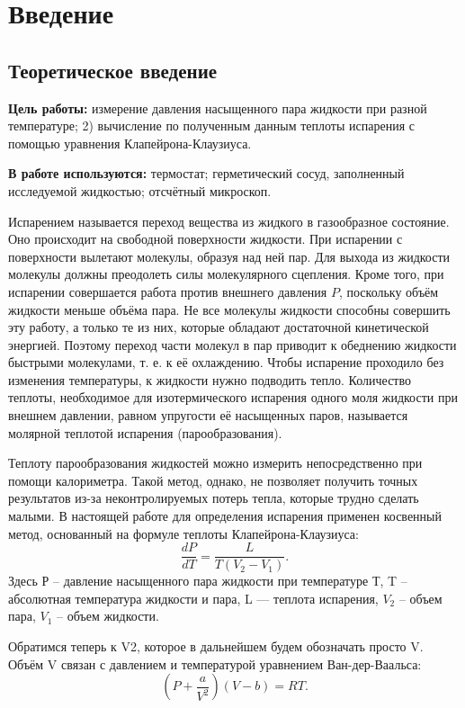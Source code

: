 \section{Введение}
\subsection{Теоретическое введение}
\textbf{Цель работы:}
измерение давления насыщенного пара жидкости
при разной температуре; 2) вычисление по полученным данным теплоты испарения с помощью уравнения Клапейрона-Клаузиуса.

\textbf{В работе используются:}
термостат; герметический
сосуд,
заполненный исследуемой жидкостью; отсчётный микроскоп.


Испарением называется переход вещества из жидкого в газообразное состояние. Оно происходит на свободной поверхности жидкости. При испарении с поверхности вылетают молекулы, образуя над ней пар. Для выхода из жидкости молекулы должны преодолеть силы молекулярного сцепления. Кроме того, при испарении совершается работа против внешнего давления $P$, поскольку объём жидкости меньше объёма пара.
Не все молекулы жидкости способны совершить эту работу, а только те
из них, которые обладают достаточной кинетической энергией. Поэтому переход части молекул в пар приводит к обеднению жидкости быстрыми
молекулами, т. е. к её охлаждению. Чтобы испарение проходило без изменения температуры, к жидкости нужно подводить тепло. Количество теплоты, необходимое для изотермического испарения одного моля жидкости при внешнем давлении, равном упругости её насыщенных паров, называется молярной теплотой испарения (парообразования).

Теплоту парообразования жидкостей можно измерить непосредственно при помощи калориметра. Такой метод, однако, не позволяет получить точных результатов из-за неконтролируемых потерь тепла, которые
трудно сделать малыми. В настоящей работе для определения испарения применен косвенный метод, основанный на формуле теплоты
Клапейрона-Клаузиуса:
\begin{equation}
    \frac{dP}{dT} = \frac{L}{T\left(V_2 - V_1\right)}.
    \label{equ:L}
\end{equation}
Здесь Р -- давление насыщенного пара жидкости при температуре Т, T --  абсолютная температура жидкости
и пара, L — теплота испарения, $V_2$ -- объем пара, $V_1$ -- объем жидкости.

Обратимся теперь к V2, которое в дальнейшем будем обозначать
просто V. Объём V связан с давлением и температурой уравнением Ван-дер-Ваальса:
\begin{equation}
    \left(P + \frac{a}{V^2}\right)\left(V-b\right) = RT.
    \label{equ:VDV}
\end{equation}

